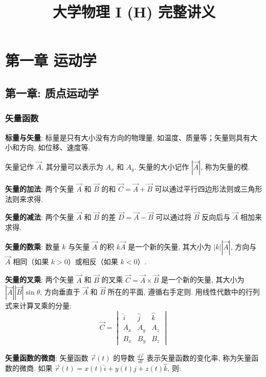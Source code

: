 \documentclass[
  a4paper,
]{ctexrep}
\title{大学物理 I (H) 完整讲义}
\author{}
\date{}
\begin{document}
\maketitle

{
\hypersetup{linkcolor=}
\setcounter{tocdepth}{2}
\tableofcontents
}
\chapter{第一章 运动学}\label{ux7b2cux4e00ux7ae0-ux8fd0ux52a8ux5b66}

\section{第一章:
质点运动学}\label{ux7b2cux4e00ux7ae0-ux8d28ux70b9ux8fd0ux52a8ux5b66}

\subsection{矢量函数}\label{ux77e2ux91cfux51fdux6570}

\textbf{标量与矢量}: 标量是只有大小没有方向的物理量,
如温度、质量等；矢量则具有大小和方向, 如位移、速度等.

矢量记作 \(\vec{A}\), 其分量可以表示为 \(A_x\) 和 \(A_y\).
矢量的大小记作 \(|\vec{A}|\), 称为矢量的模.

\textbf{矢量的加法}: 两个矢量 \(\vec{A}\) 和 \(\vec{B}\) 的和
\(\vec{C} = \vec{A} + \vec{B}\)
可以通过平行四边形法则或三角形法则来求得.

\textbf{矢量的减法}: 两个矢量 \(\vec{A}\) 和 \(\vec{B}\) 的差
\(\vec{D} = \vec{A} - \vec{B}\) 可以通过将 \(\vec{B}\) 反向后与
\(\vec{A}\) 相加来求得.

\textbf{矢量的数乘}: 数量 \(k\) 与矢量 \(\vec{A}\) 的积 \(k\vec{A}\)
是一个新的矢量, 其大小为 \(|k||\vec{A}|\), 方向与 \(\vec{A}\) 相同（如果
\(k > 0\)）或相反（如果 \(k < 0\)）.

\textbf{矢量的叉乘}: 两个矢量 \(\vec{A}\) 和 \(\vec{B}\) 的叉乘
\(\vec{C} = \vec{A} \times \vec{B}\) 是一个新的矢量, 其大小为
\(|\vec{A}||\vec{B}|\sin\theta\), 方向垂直于 \(\vec{A}\) 和 \(\vec{B}\)
所在的平面, 遵循右手定则. 用线性代数中的行列式来计算叉乘的分量:
\[\vec{C} = \begin{vmatrix}\hat{i} & \hat{j} & \hat{k} \\
A_x & A_y & A_z \\
B_x & B_y & B_z\end{vmatrix}\]

\textbf{矢量函数的微商}: 矢量函数 \(\vec{r}(t)\) 的导数
\(\frac{d\vec{r}}{dt}\) 表示矢量函数的变化率, 称为矢量函数的微商. 如果
\(\vec{r}(t) = x(t)\hat{i} + y(t)\hat{j} + z(t)\hat{k}\), 则:
\end{document}
